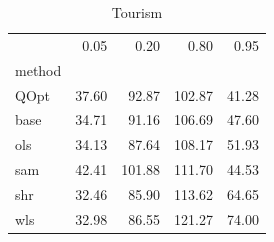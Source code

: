 \begin{table}
\caption{Tourism}
\label{ }
\begin{tabular}{lrrrr}
\toprule
 & 0.05 & 0.20 & 0.80 & 0.95 \\
method &  &  &  &  \\
\midrule
QOpt & 37.60 & 92.87 & 102.87 & 41.28 \\
base & 34.71 & 91.16 & 106.69 & 47.60 \\
ols & 34.13 & 87.64 & 108.17 & 51.93 \\
sam & 42.41 & 101.88 & 111.70 & 44.53 \\
shr & 32.46 & 85.90 & 113.62 & 64.65 \\
wls & 32.98 & 86.55 & 121.27 & 74.00 \\
\bottomrule
\end{tabular}
\end{table}
